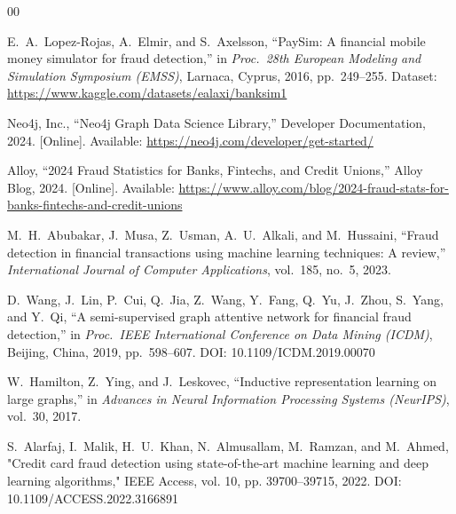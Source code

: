 \documentclass[conference]{IEEEtran}
\begin{document}
\balance
\begin{thebibliography}{00}

E.\ A.\ Lopez-Rojas, A.\ Elmir, and S.\ Axelsson, ``PaySim: A financial mobile money simulator for fraud detection,'' in \textit{Proc.\ 28th European Modeling and Simulation Symposium (EMSS)}, Larnaca, Cyprus, 2016, pp.\ 249--255. Dataset: \url{https://www.kaggle.com/datasets/ealaxi/banksim1}

Neo4j, Inc., ``Neo4j Graph Data Science Library,'' Developer Documentation, 2024. [Online]. Available: \url{https://neo4j.com/developer/get-started/}

Alloy, ``2024 Fraud Statistics for Banks, Fintechs, and Credit Unions,'' Alloy Blog, 2024. [Online]. Available: \url{https://www.alloy.com/blog/2024-fraud-stats-for-banks-fintechs-and-credit-unions}

M.\ H.\ Abubakar, J.\ Musa, Z.\ Usman, A.\ U.\ Alkali, and M.\ Hussaini, ``Fraud detection in financial transactions using machine learning techniques: A review,'' \textit{International Journal of Computer Applications}, vol.\ 185, no.\ 5, 2023.

D.\ Wang, J.\ Lin, P.\ Cui, Q.\ Jia, Z.\ Wang, Y.\ Fang, Q.\ Yu, J.\ Zhou, S.\ Yang, and Y.\ Qi, ``A semi-supervised graph attentive network for financial fraud detection,'' in \textit{Proc.\ IEEE International Conference on Data Mining (ICDM)}, Beijing, China, 2019, pp.\ 598--607. DOI: 10.1109/ICDM.2019.00070

W.\ Hamilton, Z.\ Ying, and J.\ Leskovec, ``Inductive representation learning on large graphs,'' in \textit{Advances in Neural Information Processing Systems (NeurIPS)}, vol.\ 30, 2017.

S.\ Alarfaj, I.\ Malik, H.\ U.\ Khan, N.\ Almusallam, M.\ Ramzan, and M.\ Ahmed, "Credit card fraud detection using state-of-the-art machine learning and deep learning algorithms," IEEE Access, vol. 10, pp. 39700–39715, 2022. DOI: 10.1109/ACCESS.2022.3166891

\end{thebibliography}
\end{document}
